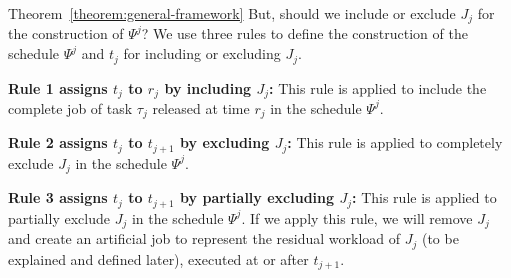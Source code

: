 \begin{appProof}{Theorem~\ref{theorem:general-framework}}
But, should we include or exclude $J_j$ for the construction of
$\Psi^j$?  We use three rules to define the construction of the
schedule $\Psi^j$ and $t_j$ for including or excluding $J_j$.
\begin{compactitem}
\item {\bf Rule 1 assigns $t_j$ to $r_j$ by including $J_j$:} This rule is applied to
  include the complete job of task $\tau_j$ released at time $r_j$
  in the schedule $\Psi^j$. 
\item {\bf Rule 2 assigns $t_j$ to $t_{j+1}$ by excluding $J_j$:} This rule is applied to
  completely exclude $J_j$ in the schedule $\Psi^j$. 
\item {\bf Rule 3 assigns $t_j$ to $t_{j+1}$ by partially excluding
    $J_j$:} This rule is applied to partially exclude $J_j$ in the
  schedule $\Psi^j$.  If we apply this rule, we will remove $J_j$ and
  create an artificial job to represent the residual workload of $J_j$
  (to be explained and defined later), executed at or after $t_{j+1}$.
\end{compactitem}


\end{appProof}
